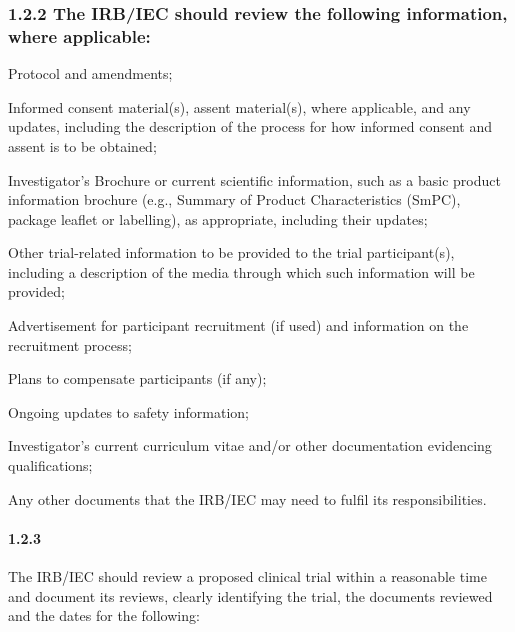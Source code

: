 \documentclass[11pt]{article}
\begin{document}
\subsubsection{1.2.2 The IRB/IEC should review the following information, where applicable:}

\begin{description}[leftmargin=2.5cm,style=sameline]

\item[(a)] Protocol and amendments;

\item[(b)] Informed consent material(s), assent material(s), where applicable, and any updates, including the description of the process for how informed consent and assent is to be obtained;

\item[(c)] Investigator's Brochure or current scientific information, such as a basic product information brochure (e.g., Summary of Product Characteristics (SmPC), package leaflet or labelling), as appropriate, including their updates;

\item[(d)] Other trial-related information to be provided to the trial participant(s), including a description of the media through which such information will be provided;

\item[(e)] Advertisement for participant recruitment (if used) and information on the recruitment process;

\item[(f)] Plans to compensate participants (if any);

\item[(g)] Ongoing updates to safety information;

\item[(h)] Investigator's current curriculum vitae and/or other documentation evidencing qualifications;

\item[(i)] Any other documents that the IRB/IEC may need to fulfil its responsibilities.

\end{description}

\paragraph{1.2.3} The IRB/IEC should review a proposed clinical trial within a reasonable time and document its reviews, clearly identifying the trial, the documents reviewed and the dates for the following:
\end{document}

